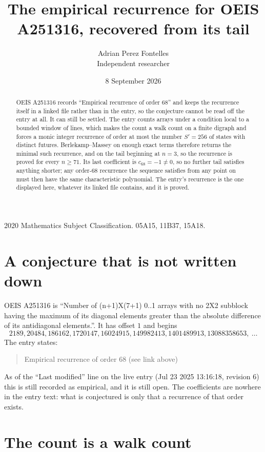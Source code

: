 \documentclass[11pt,a4paper]{article}
\title{The empirical recurrence for OEIS A251316, recovered from its tail}
\author{Adrian Perez Fontelles\\ \small Independent researcher}
\date{8 September 2026}
\theoremstyle{plain}
\theoremstyle{definition}
\begin{document}
\maketitle

\begin{abstract}
OEIS A251316 records ``Empirical recurrence of order $68$'' and keeps the recurrence itself in
a linked file rather than in the entry, so the conjecture cannot be read off the entry at all.
It can still be settled. The entry counts arrays under a condition local to a bounded window of
lines, which makes the count a walk count on a finite digraph and forces a monic integer
recurrence of order at most the number $S'=256$ of states with distinct futures. Berlekamp--Massey on
enough exact terms therefore returns the minimal such recurrence, and on the tail beginning at $n=3$, so the recurrence is proved for every $n\ge71$.
Its last coefficient is $c_{68}=-1\neq0$, so no further tail satisfies anything
shorter; any order-$68$ recurrence the sequence satisfies from any point on must then have
the same characteristic polynomial. The entry's recurrence is the one displayed here, whatever
its linked file contains, and it is proved.
\end{abstract}

\noindent\small 2020 Mathematics Subject Classification. 05A15, 11B37, 15A18.\normalsize

\section{A conjecture that is not written down}

OEIS A251316 is ``Number of (n+1)X(7+1) 0..1 arrays with no 2X2 subblock having the maximum of its diagonal elements greater than the absolute difference of its antidiagonal elements.''. It has offset $1$ and begins
\[
2189, 20484, 186162, 1720147, 16024915, 149982413, 1401489913, 13088358653,\ \dots
\]
The entry states:
\begin{quote}
Empirical recurrence of order 68 (see link above)
\end{quote}
As of the ``Last modified'' line on the live entry (Jul 23 2025 13:16:18, revision 6)
this is still recorded as empirical, and it is still open. The coefficients are nowhere in the
entry text: what is conjectured is only that a recurrence of that order exists.

\section{The count is a walk count}
\end{document}
